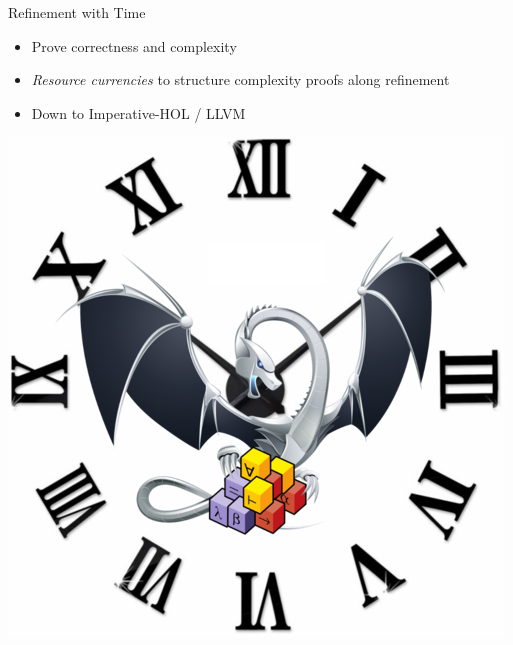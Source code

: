 \documentclass[fleqn]{beamer}
\begin{document}
\begin{frame}{Refinement with Time}
  \begin{itemize}
   \item Prove correctness and complexity
   \item \emph{Resource currencies} to structure complexity proofs along refinement
   \item Down to Imperative-HOL / LLVM

  \end{itemize}
  \includegraphics[height=.5\textheight]{isabelle-llvm-time.png}

\end{frame}
\end{document}
